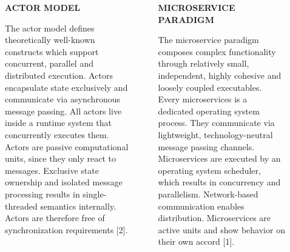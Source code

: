 \documentclass[final,hyperref={pdfpagelabels=true}]{beamer}
\begin{document}
\begin{frame}
  \begin{columns}[t]
    \begin{column}{.04\textwidth}
    \end{column}
    \begin{column}{.43\textwidth}
      \textsf{\textbf{ACTOR MODEL}} \\
      \vspace*{.5\baselineskip}
      {\lmodern
        \begin{justify}
        The actor model defines theoretically well-known constructs which support concurrent, parallel and distributed execution. Actors encapsulate state exclusively and communicate via asynchronous message passing. All actors live inside a runtime system that concurrently executes them. Actors are passive computational units, since they only react to messages. Exclusive state ownership and isolated message processing results in single-threaded semantics internally. Actors are therefore free of synchronization requirements {[2]}.
        \end{justify}
      }
    \end{column}
    \begin{column}{.06\textwidth}
    \end{column}
    \begin{column}{.43\textwidth}
      \textsf{\textbf{MICROSERVICE PARADIGM}} \\
      \vspace*{.5\baselineskip}
      {\lmodern
        \begin{justify}
        The microservice paradigm composes complex functionality through relatively small, independent, highly cohesive and loosely coupled executables. Every microservices is a dedicated operating system process. They communicate via lightweight, technology-neutral message passing channels. Microservices are executed by an operating system scheduler, which results in concurrency and parallelism. Network-based communication enables distribution. Microservices are active units and show behavior on their own accord {[1]}.
        \end{justify}
      }
    \end{column}
    \begin{column}{.04\textwidth}
    \end{column}
  \end{columns}

  \vspace*{2.2\baselineskip}


\end{frame}
\end{document}
